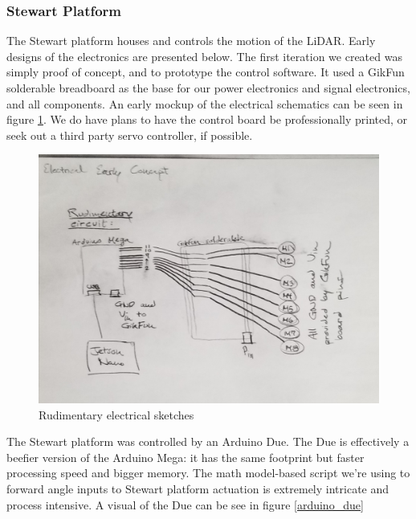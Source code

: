 \documentclass[a4paper, 10pt]{article}
\begin{document}
 		\subsubsection*{Stewart Platform}
 		The Stewart platform houses and controls the motion of the LiDAR. Early designs of the electronics are presented below. The first iteration we created was simply proof of concept, and to prototype the control software. It used a GikFun solderable breadboard as the base for our power electronics and signal electronics, and all components. An early mockup of the electrical schematics can be seen in figure \ref{basic_electrical}. We do have plans to have the control board be professionally printed, or seek out a third party servo controller, if possible.
 		
 		\begin{figure} [h]
			\centering
			\includegraphics[scale=0.2]{Photos/early_electrical}
			\caption{Rudimentary electrical sketches}
			\label{basic_electrical}
		\end{figure}

 		The Stewart platform was controlled by an Arduino Due. The Due is effectively a beefier version of the Arduino Mega: it has the same footprint but faster processing speed and bigger memory. The math model-based script we're using to forward angle inputs to Stewart platform actuation is extremely intricate and process intensive. A visual of the Due can be see in figure \ref{arduino_due}
 		
\end{document}
